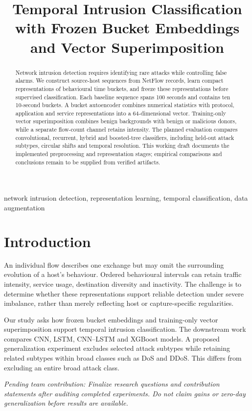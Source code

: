 \documentclass[conference]{IEEEtran}
\title{Temporal Intrusion Classification with Frozen Bucket Embeddings and Vector Superimposition}
\author{\IEEEauthorblockN{DSA4266 Project Team}\IEEEauthorblockA{Author names and affiliations to be added}}
\newcommand{\pending}[1]{\par\noindent\textit{Pending team contribution: #1}\par}
\begin{document}
\maketitle
\begin{abstract}
Network intrusion detection requires identifying rare attacks while controlling false alarms. We construct source-host sequences from NetFlow records, learn compact representations of behavioural time buckets, and freeze these representations before supervised classification. Each baseline sequence spans 100 seconds and contains ten 10-second buckets. A bucket autoencoder combines numerical statistics with protocol, application and service representations into a 64-dimensional vector. Training-only vector superimposition combines benign backgrounds with benign or malicious donors, while a separate flow-count channel retains intensity. The planned evaluation compares convolutional, recurrent, hybrid and boosted-tree classifiers, including held-out attack subtypes, circular shifts and temporal resolution. This working draft documents the implemented preprocessing and representation stages; empirical comparisons and conclusions remain to be supplied from verified artifacts.
\end{abstract}
\begin{IEEEkeywords}
network intrusion detection, representation learning, temporal classification, data augmentation
\end{IEEEkeywords}

\section{Introduction}
An individual flow describes one exchange but may omit the surrounding evolution of a host's behaviour. Ordered behavioural intervals can retain traffic intensity, service usage, destination diversity and inactivity. The challenge is to determine whether these representations support reliable detection under severe imbalance, rather than merely reflecting host or capture-specific regularities.

Our study asks how frozen bucket embeddings and training-only vector superimposition support temporal intrusion classification. The downstream work compares CNN, LSTM, CNN--LSTM and XGBoost models. A proposed generalization experiment excludes selected attack subtypes while retaining related subtypes within broad classes such as DoS and DDoS. This differs from excluding an entire broad attack class.
\pending{Finalize research questions and contribution statements after auditing completed experiments. Do not claim gains or zero-day generalization before results are available.}
\end{document}
